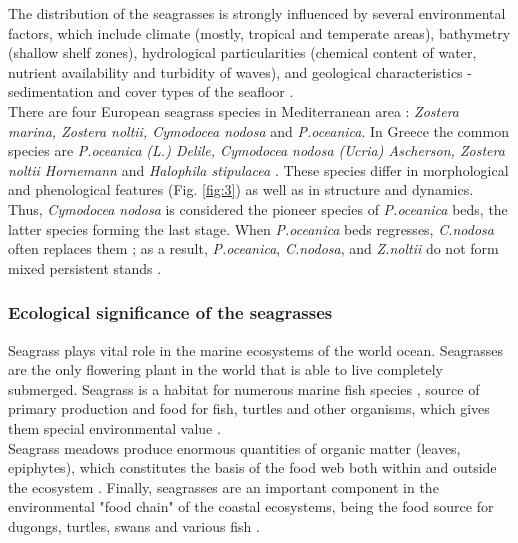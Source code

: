 \documentclass[11pt]{article}
\begin{document}
The distribution of the seagrasses is strongly influenced by several environmental factors, which
include climate (mostly, tropical and temperate areas), bathymetry (shallow shelf zones), hydrological
particularities (chemical content of water, nutrient availability and turbidity of waves), and geological 
characteristics - sedimentation and cover types of the seafloor \cite{McKenzie06}\label{McKenzie06}.\\
There are four European seagrass species  in Mediterranean area \cite{Borum04}\label{Borum04}: \textit{Zostera marina,
Zostera noltii, Cymodocea nodosa} and \textit{P.oceanica}. In Greece the common species are \textit{P.oceanica}
\textit{(L.) Delile, Cymodocea nodosa (Ucria) Ascherson, Zostera noltii Hornemann} and \textit{Halophila
stipulacea} \cite{Amoutzopoulou-Schina05}\label{Amoutzopoulou-Schina05}. 
These species differ in morphological and phenological features (Fig. \ref{fig:3}) as well as in structure and dynamics. Thus, \textit{Cymodocea nodosa} is
considered the pioneer species of \textit{P.oceanica} beds, the latter species forming the last stage. When \textit{P.oceanica} beds regresses, \textit{C.nodosa} often replaces them \cite{DenHartog77}\label{DenHartog77}; as a result, \textit{P.oceanica},
\textit{C.nodosa}, and \textit{Z.noltii} do not form mixed persistent stands \cite{Buia91}\label{Buia91}.

\subsubsection{Ecological significance of the seagrasses}
Seagrass plays vital role in the marine ecosystems of the world ocean. 
Seagrasses are the only flowering plant in the world that is able to live completely submerged. Seagrass is a habitat for
numerous marine fish species \cite{Nagelkerken00}\label{Nagelkerken00}, source of primary production and food for
fish, turtles and other organisms, which gives them special environmental value \cite{Noralez10}\label{Noralez10}.\\
Seagrass meadows produce enormous quantities of organic matter (leaves, epiphytes), which
constitutes the basis of the food web both within and outside the ecosystem \cite{Gobert06}\label{Gobert06}.
Finally, seagrasses are an important component in the environmental "food chain" of the coastal
ecosystems, being the food source for dugongs, turtles, swans and various fish \cite{Cappo95}\label{Cappo95}.
\end{document}
